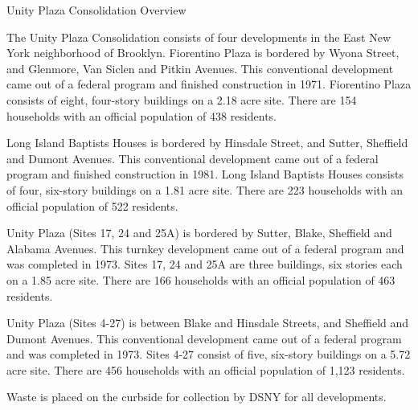 Unity Plaza Consolidation Overview

The Unity Plaza Consolidation consists of four developments in the East New York neighborhood of Brooklyn. Fiorentino Plaza is bordered by Wyona Street, and Glenmore, Van Siclen and Pitkin Avenues. This conventional development came out of a federal program and finished construction in 1971. Fiorentino Plaza consists of eight, four-story buildings on a 2.18 acre site. There are 154 households with an official population of 438 residents. 

Long Island Baptists Houses is bordered by Hinsdale Street, and Sutter, Sheffield and Dumont Avenues. This conventional development came out of a federal program and finished construction in 1981. Long Island Baptists Houses consists of four, six-story buildings on a 1.81 acre site. There are 223 households with an official population of 522 residents.

Unity Plaza (Sites 17, 24 and 25A) is bordered by Sutter, Blake, Sheffield and Alabama Avenues. This turnkey development came out of a federal program and was completed in 1973. Sites 17, 24 and 25A are three buildings, six stories each on a 1.85 acre site. There are 166 households with an official population of 463 residents.

Unity Plaza (Sites 4-27) is between Blake and Hinsdale Streets, and Sheffield and Dumont Avenues. This conventional development came out of a federal program and was completed in 1973. Sites 4-27 consist of five, six-story buildings on a 5.72 acre site. There are 456 households with an official population of 1,123 residents.

Waste is placed on the curbside for collection by DSNY for all developments.